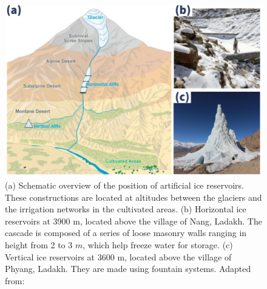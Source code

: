 \begin{figure}[t]
\centering
\includegraphics[width=12cm]{Figures/AIR_forms.jpg}

\caption{(a) Schematic overview of the position of artificial ice reservoirs. These constructions are located at
  altitudes between the glaciers and the irrigation networks in the cultivated areas. (b) Horizontal ice
  reservoirs at 3900 m, located above the village of Nang, Ladakh. The cascade is composed of a series of loose
  masonry walls ranging in height from 2 to 3 $m$, which help freeze water for storage. (c) Vertical ice
reservoirs at 3600 m, located above the village of Phyang, Ladakh. They are made using fountain systems. Adapted
from: \cite{nusserLocalKnowledgeGlobal2016}}

\label{fig:AIRforms}
\end{figure}
